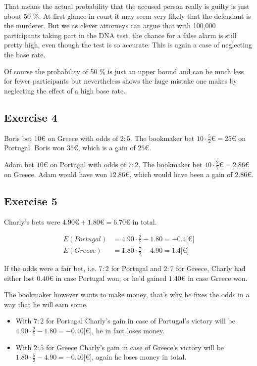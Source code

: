 That means the actual probability that the accused person really is guilty is just about 50 \%. At first glance in court it may seem very likely that the defendant is the murderer. But we as clever attorneys can argue that with 100,000 participants taking part in the DNA test, the chance for a false alarm is still pretty high, even though the test is so accurate. This is again a case of neglecting the base rate. 

\bigskip

Of course the probability of 50 \% is just an upper bound and can be much less for fewer participants but nevertheless shows the huge mistake one makes by neglecting the effect of a high base rate.  

\subsection*{Exercise 4}
Boris bet $10\euro$ on Greece with odds of $2 : 5$. The bookmaker bet $10\cdot\frac{5}{2}\euro=25\euro$ on Portugal. Boris won $35\euro$, which is a gain of $25\euro$.

Adam bet $10\euro$ on Portugal with odds of $7 : 2$. The bookmaker bet $10\cdot\frac{2}{7}\euro=2.86\euro$ on Greece. Adam would have won $12.86\euro$, which would have been a gain of $2.86\euro$.

\subsection*{Exercise 5}
Charly's bets were $4.90\euro+1.80\euro=6.70\euro$ in total.

\begin{align*}
E(Portugal) &= 4.90 \cdot \frac{2}{7} - 1.80 = -0.4 {[}\euro{]} \\
E(Greece)   &= 1.80 \cdot \frac{7}{2} - 4.90 =  1.4 {[}\euro{]}
\end{align*}

If the odds were a fair bet, i.e. $7 : 2$ for Portugal and $2 : 7$ for Greece, Charly had either lost $0.40\euro$ in case Portugal won, or he'd gained $1.40\euro$ in case Greece won.

\bigskip

The bookmaker however wants to make money, that's why he fixes the odds in a way that he will earn some.

\begin{itemize}
	\item[] With $7 : 2$ for Portugal Charly's gain in case of Portugal's victory will be $4.90 \cdot \frac{2}{7} - 1.80 = -0.40 {[}\euro{]}$, he in fact loses money.
  \item[] With $2 : 5$ for Greece Charly's gain in case of Greece's victory will be $1.80 \cdot \frac{5}{2} - 4.90 = -0.40 {[}\euro{]}$, again he loses money in total.
\end{itemize}

